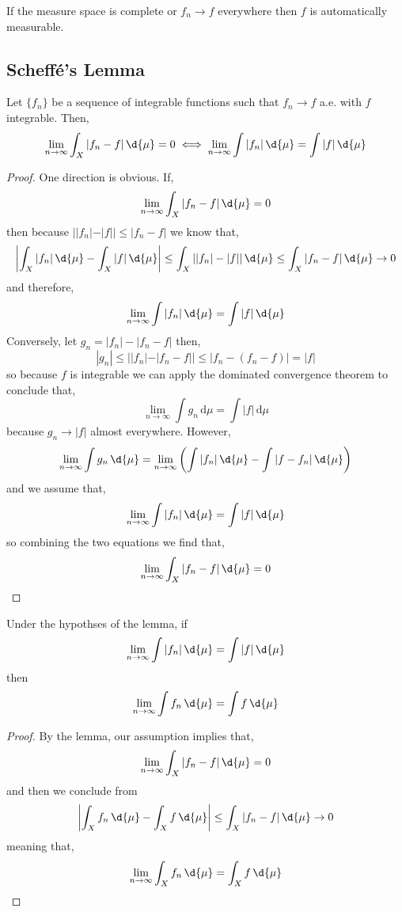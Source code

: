 \documentclass[12pt]{article}
\begin{document}
\begin{rmk}
If the measure space is complete or $f_n \to f$ everywhere then $f$ is automatically measurable.
\end{rmk}

\subsection{Scheff\'{e}'s Lemma}

\begin{lemma}[Scheff\'{e}]
Let $\{ f_n \}$ be a sequence of integrable functions such that $f_n \to f$ a.e. with $f$ integrable. Then,
\[ \lim_{n \to \infty} \int_X |f_n - f| \, \d{\mu} = 0 \iff \lim_{n \to \infty} \int |f_n| \, \d{\mu} = \int |f| \, \d{\mu} \]
\end{lemma}

\begin{proof}
One direction is obvious. If, 
\[ \lim_{n \to \infty} \int_X |f_n - f| \, \d{\mu} = 0 \]
then because $||f_n| - |f|| \le |f_n - f|$ we know that,
\[ \left| \int_X |f_n| \, \d{\mu} - \int_X |f| \, \d{\mu} \right| \le \int_X ||f_n| - |f|| \, \d{\mu} \le \int_X |f_n - f| \, \d{\mu} \to 0 \]
and therefore,
\[ \lim_{n \to \infty} \int |f_n| \, \d{\mu} = \int |f| \, \d{\mu} \]
Conversely, let $g_n = |f_n| - |f_n - f|$ then,
\[ |g_n| \le ||f_n| - |f_n - f|| \le |f_n - (f_n - f)| = |f| \]
so because $f$ is integrable we can apply the dominated convergence theorem to conclude that,
\[ \lim_{n \to \infty} \int g_n \, \mathrm{d}\mu = \int |f| \, \mathrm{d} \mu \]  
because $g_n \to |f|$ almost everywhere. However, 
\[ \lim_{n \to \infty} \int g_n \, \d{\mu} = \lim_{n \to \infty} \left( \int |f_n| \, \d{\mu} - \int |f - f_n| \, \d{\mu} \right) \]
and we assume that,
\[   \lim_{n \to \infty} \int |f_n| \, \d{\mu} = \int |f| \, \d{\mu} \]
so combining the two equations we find that,
\[ \lim_{n \to \infty} \int_X |f_n - f| \, \d{\mu} = 0 \]
\end{proof}

\begin{cor}
Under the hypothses of the lemma, if
\[ \lim_{n \to \infty} \int |f_n| \, \d{\mu} = \int |f| \, \d{\mu} \]
then
\[ \lim_{n \to \infty} \int f_n \, \d{\mu} = \int f \, \d{\mu} \]
\end{cor}

\begin{proof}
By the lemma, our assumption implies that,
\[ \lim_{n \to \infty} \int_X |f_n - f| \, \d{\mu} = 0 \]
and then we conclude from
\[ \left| \int_X f_n \, \d{\mu} - \int_X f \, \d{\mu} \right| \le \int_X |f_n - f| \, \d{\mu} \to 0 \]
meaning that,
\[ \lim_{n \to \infty} \int_X f_n \, \d{\mu} = \int_X f \, \d{\mu} \]
\end{proof}
\end{document}
